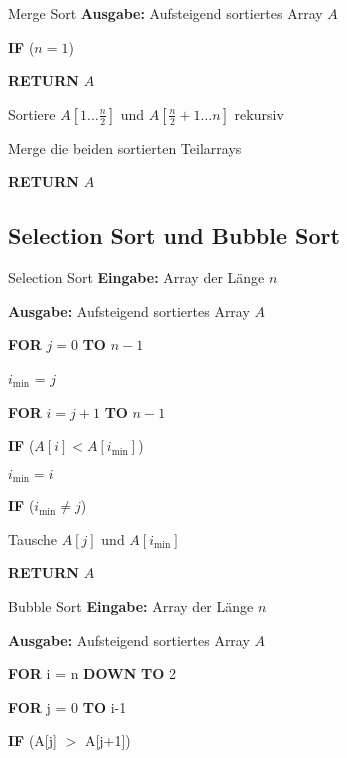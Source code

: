 \documentclass{panikzettel}
\newcommand\tab[1][1cm]{\hspace*{#1}}
\begin{document}
{\begin{halfboxr}
\begin{algo}{Merge Sort}
		\textbf{Ausgabe:} Aufsteigend sortiertes Array $A$
		\tcblower
		
		\textbf{IF} ($n=1$)
		
		\tab \textbf{RETURN} $A$
		
		Sortiere $A[1 \dots \frac{n}{2}]$ und $A[\frac{n}{2} +1 \dots n]$ rekursiv
		
		Merge die beiden sortierten Teilarrays
		
		\textbf{RETURN} $A$
	\end{algo}
\end{halfboxr}

\subsection{Selection Sort und Bubble Sort}

\begin{halfboxl}
	\vspace{-\baselineskip}
	\begin{algo}{Selection Sort}
		\textbf{Eingabe:} Array der Länge $n$
		
		\textbf{Ausgabe:} Aufsteigend sortiertes Array $A$
		\tcblower
		
		\textbf{FOR} $j=0$ \textbf{TO} $n-1$
		
		\tab $i_{\min}$ = $j$
		
		\tab \textbf{FOR} $i = j + 1 $ \textbf{TO} $n-1$
		
		\tab\tab \textbf{IF} ($A[i] < A[i_{\min}]$)
		
		\tab\tab\tab $i_{\min} = i$
		
		\tab \textbf{IF} ($i_{\min} \neq j$)
		
		\tab\tab Tausche $A[j]$ und $A[i_{\min}]$
		
		\textbf{RETURN} $A$
	\end{algo}
\end{halfboxl}%
\begin{halfboxr}
	\vspace{-\baselineskip}
	\begin{algo}{Bubble Sort}
		\textbf{Eingabe:} Array der Länge $n$
		
		\textbf{Ausgabe:} Aufsteigend sortiertes Array $A$
		\tcblower
		
		\textbf{FOR} i = n \textbf{DOWN}\footnotemark \textbf{ TO} 2
		
		\tab \textbf{FOR} j = 0 \textbf{TO} i-1
		
		\tab\tab \textbf{IF} (A[j] $>$ A[j+1])
		

\end{algo}
\end{halfboxr}}
\end{document}
